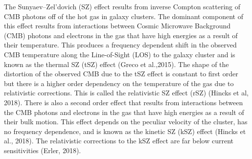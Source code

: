 \documentclass{princeton_astro_thesis}
\begin{document}
\par The Sunyaev--Zel'dovich (SZ) effect results from inverse Compton scattering of CMB photons off of the hot gas in galaxy clusters. The dominant component of this effect results from interactions between Cosmic Microwave Background (CMB) photons and electrons in the gas that have high energies as a result of their temperature. This produces a frequency dependent shift in the observed CMB temperature along the Line-of-Sight (LOS) to the galaxy cluster and is known as the thermal SZ (tSZ) effect (Greco et al.,2015). The shape of the distortion of the observed CMB due to the tSZ effect is constant to first order but there is a higher order dependency on the temperature of the gas due to relativistic corrections. This is called the relativistic SZ effect (rSZ) (Hincks et al, 2018). There is also a second order effect that results from interactions between the CMB photons and electrons in the gas that have high energies as a result of their bulk motion. This effect depends on the peculiar velocity of the cluster, has no frequency dependence, and is known as the kinetic SZ (kSZ) effect (Hincks et al., 2018). The relativistic corrections to the kSZ effect are far below current sensitivities (Erler, 2018). 
\end{document}

